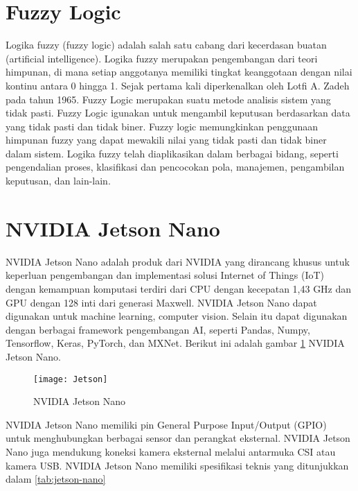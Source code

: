 \section{Fuzzy Logic}
Logika fuzzy (fuzzy logic) adalah salah satu cabang dari kecerdasan buatan (artificial intelligence). Logika fuzzy merupakan pengembangan dari teori himpunan, di mana setiap anggotanya memiliki tingkat keanggotaan dengan nilai kontinu antara 0 hingga 1. Sejak pertama kali diperkenalkan oleh Lotfi A. Zadeh pada tahun 1965. Fuzzy Logic merupakan suatu metode analisis sistem yang tidak pasti. Fuzzy Logic igunakan untuk mengambil keputusan berdasarkan data yang tidak pasti dan tidak biner. Fuzzy logic memungkinkan penggunaan himpunan fuzzy yang dapat mewakili nilai yang tidak pasti dan tidak biner dalam sistem. Logika fuzzy telah diaplikasikan dalam berbagai bidang, seperti pengendalian proses, klasifikasi dan pencocokan pola, manajemen, pengambilan keputusan, dan lain-lain.

\section{NVIDIA Jetson Nano}
NVIDIA Jetson Nano adalah produk dari NVIDIA yang dirancang khusus untuk keperluan pengembangan dan implementasi solusi Internet of Things (IoT) dengan kemampuan komputasi terdiri dari CPU dengan kecepatan 1,43 GHz dan GPU dengan 128 inti dari generasi Maxwell. NVIDIA Jetson Nano dapat digunakan untuk machine learning, computer vision. Selain itu dapat digunakan dengan berbagai framework pengembangan AI, seperti Pandas, Numpy, Tensorflow, Keras, PyTorch, dan MXNet. Berikut ini adalah gambar \cref{fig:jetson} NVIDIA Jetson Nano.

\begin{figure}[H]
	\centering
	\texttt{[image: Jetson]}
	\caption{NVIDIA Jetson Nano}
	\label{fig:jetson}
\end{figure}

NVIDIA Jetson Nano memiliki pin General Purpose Input/Output (GPIO) untuk menghubungkan berbagai sensor dan perangkat eksternal. NVIDIA Jetson Nano juga mendukung koneksi kamera eksternal melalui antarmuka CSI atau kamera USB. NVIDIA Jetson Nano memiliki spesifikasi teknis yang ditunjukkan dalam \cref{tab:jetson-nano}	


